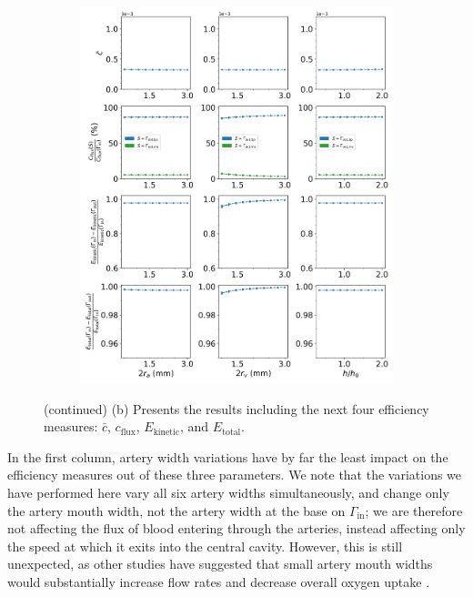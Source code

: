             \begin{figure}\ContinuedFloat
                \centering
                \begin{subfigure}{\textwidth}
                    \includegraphics[width=1\textwidth]{diagrams/results-variations/mega2_artery_width_vein_width_wall_height_ratio.png}
                    \caption{}
                    \label{fig:mega-other1:2}
                \end{subfigure}
                \caption{(continued) (b) Presents the results including the next four efficiency measures: $\bar{c}$, $c_\text{flux}$, $E_\text{kinetic}$, and $E_\text{total}$.}
                \label{fig:mega-other1}
            \end{figure}

            In the first column, artery width variations have by far the least impact on the efficiency measures out of these three parameters. We note that the variations we have performed here vary all six artery widths simultaneously, and change only the artery mouth width, not the artery width at the base on $\Gamma_\text{in}$; we are therefore not affecting the flux of blood entering through the arteries, instead affecting only the speed at which it exits into the central cavity. However, this is still unexpected, as other studies have suggested that small artery mouth widths would substantially increase flow rates and decrease overall oxygen uptake \cite{burtonRheologicalPhysiologicalConsequences2009}.

